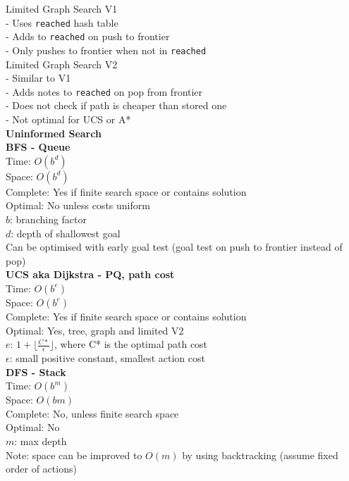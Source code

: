 \documentclass[10pt, a4paper]{article}
\newcommand{\red}[1]{{\color{red}#1}}
\newcommand{\green}[1]{{\color{ForestGreen}#1}}
\newcommand{\header}[1]{{\normalsize\textbf{#1}}}
\newcommand{\tab}[0]{\hspace*{2mm}}
\begin{document}
\begin{multicols*}{3}
	  Limited Graph Search V1\\
	  \tab - Uses \texttt{reached} hash table\\
	  \tab - Adds to \texttt{reached} on push to frontier\\
	  \tab - Only pushes to frontier when not in \texttt{reached}\\
	  Limited Graph Search V2\\
	  \tab - Similar to V1\\
	  \tab - Adds notes to \texttt{reached} on pop from frontier\\
	  \tab - \red{Does not} check if path is cheaper than stored one\\
	  \tab - \red{Not optimal} for UCS or A*\\

	  \header{Uninformed Search} \\
	  \textbf{BFS - Queue}\\
	  Time: $O(b^{d})$\\
	  Space: $O(b^{d})$\\
	  Complete: Yes if finite search space or contains solution\\
	  Optimal: No unless costs uniform\\
	  $b$: branching factor\\
	  $d$: depth of shallowest goal\\
	  \green{Can be optimised} with \red{early goal test} (goal test on push to frontier instead of pop)\\

	  \textbf{UCS aka Dijkstra - PQ, path cost}\\
	  Time: $O(b^{e})$ \\
	  Space: $O(b^{e})$\\
	  Complete: Yes if finite search space or contains solution\\
	  Optimal: Yes, tree, graph and limited V2\\
	  $e$: $1 + \lfloor \frac{C*}{\epsilon} \rfloor$, where C* is the optimal path cost\\
	  $\epsilon$: small positive constant, smallest action cost\\

	  \textbf{DFS - Stack}\\
	  Time: $O(b^{m})$\\
	  Space: $O(bm)$\\
	  Complete: No, unless finite search space\\
	  Optimal: No\\
	  $m$: max depth\\
	  \red{Note}: space can be improved to $O(m)$ by using backtracking (assume fixed order of actions)\\


\end{multicols*}
\end{document}

